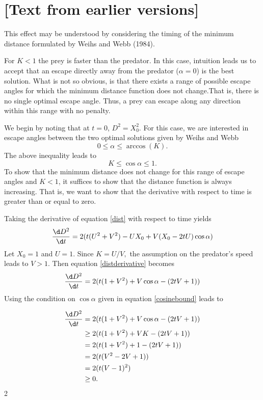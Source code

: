 
\section{[Text from earlier versions]}


This effect may be understood by considering the timing of the minimum distance formulated by Weihs and Webb (1984). 

For $K<1$ the prey is faster than the predator. In this case, intuition leads us to accept that an escape directly away from the predator ($\alpha =0$) is the best solution. What is not so obvious, is that there exists a range of possible escape angles for which the minimum distance function does not change.That is, there is no single optimal escape angle. Thus, a prey can escape along any direction within this range with no penalty.

We begin by noting that at $t=0$, $D^2 = X_0^2.$ For this case, we are interested in escape angles between the two optimal solutions given by Weihs and Webb
%
\begin{equation}
0 \leq \alpha \leq \arccos(K).
\label{anglerange}
\end{equation}
The above inequality leads to 
\begin{equation}
K \leq \cos\alpha \leq 1.
\label{cosinebound}
\end{equation}      
%
To show that the minimum distance does not change for this range of escape angles and $K<1$, it suffices to show that the distance function is always increasing. That is, we want to show that the derivative with respect to time is greater than or equal to zero. 

Taking the derivative of equation \eqref{dist} with respect to time yields
%
\begin{equation}
\frac{\d D^2}{\d t}  = 2(t(U^2+V^2) - UX_0 + V(X_0-2tU)\cos\alpha)
\label{distderivative}
\end{equation}  
%
Let $X_0=1$ and $U=1$. Since $K = U/V,$ the assumption on the predator's speed leads to $V > 1.$ 
Then equation \eqref{distderivative} becomes
%
\begin{equation}
\frac{\d D^2}{\d t}  = 2(t(1+V^2) +V\cos\alpha - (2tV + 1))
\label{distderivative2}
\end{equation}
%
Using the condition on $\cos\alpha$ given in equation \eqref{cosinebound} leads to

\begin{align*}
\frac{\d D^2}{\d t}  & = 2(t(1+V^2) +V\cos\alpha - (2tV + 1)) \\
& \geq 2(t(1+V^2) +VK - (2tV + 1)) \\
& = 2(t(1+V^2) +1 - (2tV + 1)) \\
& = 2(t(V^2- 2V + 1)) \\
& =2(t(V-1)^2)\\
& \geq 0.
\end{align*}2

